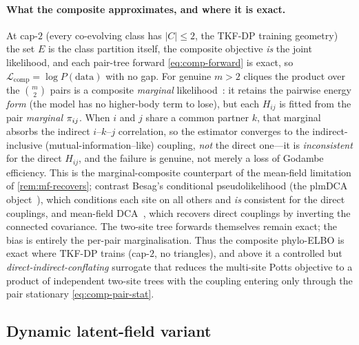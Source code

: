 \paragraph{What the composite approximates, and where it is exact.} At
cap-$2$ (every co-evolving class has $|C|\le2$, the TKF-DP training
geometry) the set $E$ is the class partition itself, the composite objective
\emph{is} the joint likelihood, and each pair-tree forward
\eqref{eq:comp-forward} is exact, so $\mathcal{L}_{\mathrm{comp}}=\log
P(\text{data})$ with no gap. For genuine $m>2$ cliques the product over the
$\binom{m}{2}$ pairs is a composite \emph{marginal}
likelihood~\citep{lindsay1988,varin2011}: it retains the pairwise energy
\emph{form} (the model has no higher-body term to lose), but each $H_{ij}$
is fitted from the pair \emph{marginal} $\pi_{ij}$. When $i$ and $j$ share
a common partner $k$, that marginal absorbs the indirect $i$--$k$--$j$
correlation, so the estimator converges to the indirect-inclusive
(mutual-information--like) coupling, \emph{not} the direct one---it is
\emph{inconsistent} for the direct $H_{ij}$, and the failure is genuine, not
merely a loss of Godambe efficiency. This is the marginal-composite
counterpart of the mean-field limitation of \autoref{rem:mf-recovers};
contrast Besag's conditional pseudolikelihood (the plmDCA
object~\citep{ekeberg2013,besag1975}), which conditions each site on all
others and \emph{is} consistent for the direct couplings, and mean-field
DCA~\citep{Morcos2011}, which recovers direct couplings by inverting the
connected covariance. The two-site tree forwards themselves remain exact;
the bias is entirely the per-pair marginalisation. Thus the composite
phylo-ELBO is exact where TKF-DP trains (cap-$2$, no triangles), and above
it a controlled but \emph{direct-indirect-conflating} surrogate that reduces
the multi-site Potts objective to a product of independent two-site trees
with the coupling entering only through the pair stationary
\eqref{eq:comp-pair-stat}.

\subsection{Dynamic latent-field variant}
\label{sec:dynamic-suppl}

